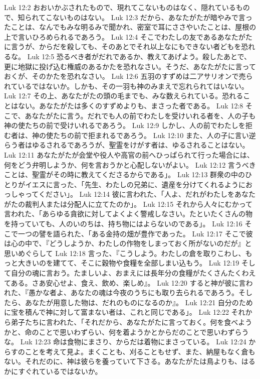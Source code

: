 Luk 12:2  おおいかぶされたもので、現れてこないものはなく、隠れているもので、知られてこないものはない。
Luk 12:3  だから、あなたがたが暗やみで言ったことは、なんでもみな明るみで聞かれ、密室で耳にささやいたことは、屋根の上で言いひろめられるであろう。
Luk 12:4  そこでわたしの友であるあなたがたに言うが、からだを殺しても、そのあとでそれ以上なにもできない者どもを恐れるな。
Luk 12:5  恐るべき者がだれであるか、教えてあげよう。殺したあとで、更に地獄に投げ込む権威のあるかたを恐れなさい。そうだ、あなたがたに言っておくが、そのかたを恐れなさい。
Luk 12:6  五羽のすずめは二アサリオンで売られているではないか。しかも、その一羽も神のみまえで忘れられてはいない。
Luk 12:7  その上、あなたがたの頭の毛までも、みな数えられている。恐れることはない。あなたがたは多くのすずめよりも、まさった者である。
Luk 12:8  そこで、あなたがたに言う。だれでも人の前でわたしを受けいれる者を、人の子も神の使たちの前で受けいれるであろう。
Luk 12:9  しかし、人の前でわたしを拒む者は、神の使たちの前で拒まれるであろう。
Luk 12:10  また、人の子に言い逆らう者はゆるされるであろうが、聖霊をけがす者は、ゆるされることはない。
Luk 12:11  あなたがたが会堂や役人や高官の前へひっぱられて行った場合には、何をどう弁明しようか、何を言おうかと心配しないがよい。
Luk 12:12  言うべきことは、聖霊がその時に教えてくださるからである」。
Luk 12:13  群衆の中のひとりがイエスに言った、「先生、わたしの兄弟に、遺産を分けてくれるようにおっしゃってください」。
Luk 12:14  彼に言われた、「人よ、だれがわたしをあなたがたの裁判人または分配人に立てたのか」。
Luk 12:15  それから人々にむかって言われた、「あらゆる貪欲に対してよくよく警戒しなさい。たといたくさんの物を持っていても、人のいのちは、持ち物にはよらないのである」。
Luk 12:16  そこで一つの譬を語られた、「ある金持の畑が豊作であった。
Luk 12:17  そこで彼は心の中で、『どうしようか、わたしの作物をしまっておく所がないのだが』と思いめぐらして
Luk 12:18  言った、『こうしよう。わたしの倉を取りこわし、もっと大きいのを建てて、そこに穀物や食糧を全部しまい込もう。
Luk 12:19  そして自分の魂に言おう。たましいよ、おまえには長年分の食糧がたくさんたくわえてある。さあ安心せよ、食え、飲め、楽しめ』。
Luk 12:20  すると神が彼に言われた、『愚かな者よ、あなたの魂は今夜のうちにも取り去られるであろう。そしたら、あなたが用意した物は、だれのものになるのか』。
Luk 12:21  自分のために宝を積んで神に対して富まない者は、これと同じである」。
Luk 12:22  それから弟子たちに言われた、「それだから、あなたがたに言っておく。何を食べようかと、命のことで思いわずらい、何を着ようかとからだのことで思いわずらうな。
Luk 12:23  命は食物にまさり、からだは着物にまさっている。
Luk 12:24  からすのことを考えて見よ。まくことも、刈ることもせず、また、納屋もなく倉もない。それだのに、神は彼らを養っていて下さる。あなたがたは鳥よりも、はるかにすぐれているではないか。
